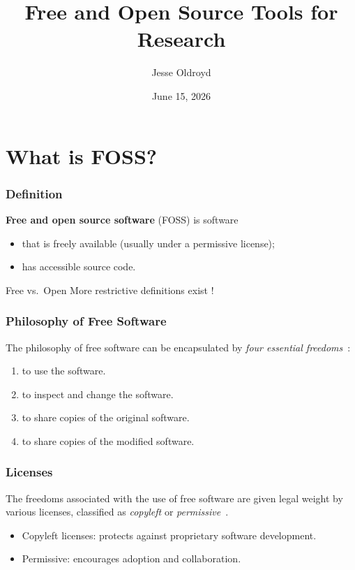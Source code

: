 \documentclass{beamer}
\title{Free and Open Source Tools for Research}
\author[J. Oldroyd]{Jesse Oldroyd}
\date[2026/06/15]{June 15, 2026}
\begin{document}
\maketitle

\section{What is FOSS?}

\begin{frame}[<+->]
	\frametitle{Definition}
	\textbf{Free and open source software} (FOSS) is software
	\begin{itemize}
		\item that is freely available (usually under a permissive license);
		      \vfill
		\item has accessible source code.
		      \vfill
	\end{itemize}

	\begin{alertblock}{Free vs.\ Open}
		More restrictive definitions exist \cite{OpenSourceGNU2007}!
	\end{alertblock}
	\vfill
\end{frame}

\begin{frame}
	\frametitle{Philosophy of Free Software}
	The philosophy of free software can be encapsulated by \textit{four essential freedoms}~\cite{PhilosophyGNUProject}:
	\begin{enumerate}
		\item<2-> to use the software.
		      \vfill
		\item<3-> to inspect and change the software.
		      \vfill
		\item<4-> to share copies of the original software.
		      \vfill
		\item<5-> to share copies of the modified software.
		      \vfill
	\end{enumerate}
\end{frame}

\begin{frame}[<+->]
	\frametitle{Licenses}
	The freedoms associated with the use of free software are given legal weight by various \alert{licenses}, classified as \textit{copyleft} or \textit{permissive}~\cite{ChooseLicenseOpen}.
	\begin{itemize}
		\item Copyleft licenses: protects against proprietary software development.

		      \vfill

		\item Permissive: encourages adoption and collaboration.

		      \vfill
	\end{itemize}

\end{frame}
\end{document}
